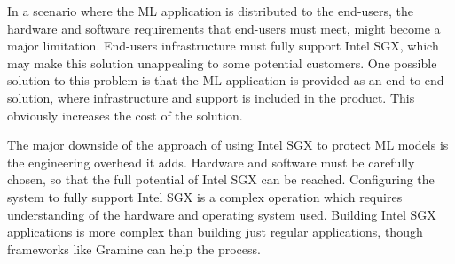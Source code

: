 In a scenario where the ML application is distributed to the end-users, the hardware and software requirements that end-users must meet, might become a major limitation. End-users infrastructure must fully support Intel SGX, which may make this solution unappealing to some potential customers. One possible solution to this problem is that the ML application is provided as an end-to-end solution, where infrastructure and support is included in the product. This obviously increases the cost of the solution.

The major downside of the approach of using Intel SGX to protect ML models is the engineering overhead it adds. Hardware and software must be carefully chosen, so that the full potential of Intel SGX can be reached. Configuring the system to fully support Intel SGX is a complex operation which requires understanding of the hardware and operating system used. Building Intel SGX applications is more complex than building just regular applications, though frameworks like Gramine can help the process.
